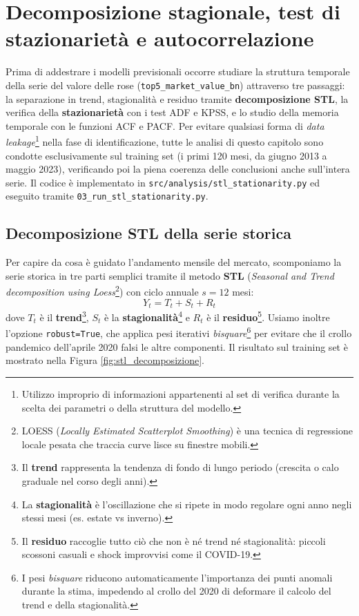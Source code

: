 \section{Decomposizione stagionale, test di stazionarietà e autocorrelazione}
\label{sec:p2_stl}

Prima di addestrare i modelli previsionali occorre studiare la struttura temporale della serie del valore delle rose (\texttt{top5\_market\_value\_bn}) attraverso tre passaggi: la separazione in trend, stagionalità e residuo tramite \textbf{decomposizione STL}, la verifica della \textbf{stazionarietà} con i test ADF e KPSS, e lo studio della memoria temporale con le funzioni ACF e PACF. Per evitare qualsiasi forma di \textit{data leakage}\footnote{Utilizzo improprio di informazioni appartenenti al set di verifica durante la scelta dei parametri o della struttura del modello.} nella fase di identificazione, tutte le analisi di questo capitolo sono condotte esclusivamente sul training set (i primi 120 mesi, da giugno 2013 a maggio 2023), verificando poi la piena coerenza delle conclusioni anche sull'intera serie. Il codice è implementato in \texttt{src/analysis/stl\_stationarity.py} ed eseguito tramite \texttt{03\_run\_stl\_stationarity.py}.

\subsection{Decomposizione STL della serie storica}

Per capire da cosa è guidato l'andamento mensile del mercato, scomponiamo la serie storica in tre parti semplici tramite il metodo \textbf{STL} (\textit{Seasonal and Trend decomposition using Loess}\footnote{LOESS (\textit{Locally Estimated Scatterplot Smoothing}) è una tecnica di regressione locale pesata che traccia curve lisce su finestre mobili.}) con ciclo annuale $s = 12$ mesi:
\begin{equation}
    Y_t = T_t + S_t + R_t
    \label{eq:decomposizione_stl}
\end{equation}
dove $T_t$ è il \textbf{trend}\footnote{Il \textbf{trend} rappresenta la tendenza di fondo di lungo periodo (crescita o calo graduale nel corso degli anni).}, $S_t$ è la \textbf{stagionalità}\footnote{La \textbf{stagionalità} è l'oscillazione che si ripete in modo regolare ogni anno negli stessi mesi (es. estate vs inverno).} e $R_t$ è il \textbf{residuo}\footnote{Il \textbf{residuo} raccoglie tutto ciò che non è né trend né stagionalità: piccoli scossoni casuali e shock improvvisi come il COVID-19.}. Usiamo inoltre l'opzione \texttt{robust=True}, che applica pesi iterativi \textit{bisquare}\footnote{I pesi \textit{bisquare} riducono automaticamente l'importanza dei punti anomali durante la stima, impedendo al crollo del 2020 di deformare il calcolo del trend e della stagionalità.} per evitare che il crollo pandemico dell'aprile 2020 falsi le altre componenti. Il risultato sul training set è mostrato nella Figura \ref{fig:stl_decomposizione}.


